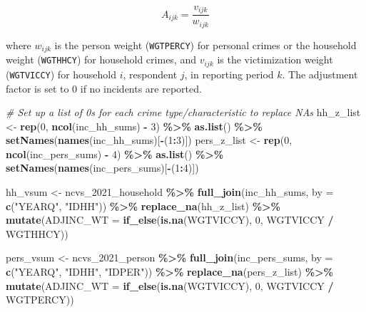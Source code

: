 \documentclass[
]{krantz}
\makeatletter
\newenvironment{Shaded}{\begin{snugshade}}{\end{snugshade}}
\newcommand{\AttributeTok}[1]{\textcolor[rgb]{0.27,0.27,0.27}{#1}}
\newcommand{\CommentTok}[1]{\textcolor[rgb]{0.37,0.37,0.37}{\textit{#1}}}
\newcommand{\DecValTok}[1]{\textcolor[rgb]{0.06,0.06,0.06}{#1}}
\newcommand{\FunctionTok}[1]{\textcolor[rgb]{0.27,0.27,0.27}{\textbf{#1}}}
\newcommand{\NormalTok}[1]{#1}
\newcommand{\OtherTok}[1]{\textcolor[rgb]{0.37,0.37,0.37}{#1}}
\newcommand{\SpecialCharTok}[1]{\textcolor[rgb]{0.43,0.43,0.43}{\textbf{#1}}}
\newcommand{\StringTok}[1]{\textcolor[rgb]{0.5,0.5,0.5}{#1}}
\newenvironment{kframe}{%
\medskip{}
\setlength{\fboxsep}{.8em}
 \def\at@end@of@kframe{}%
 \ifinner\ifhmode%
  \def\at@end@of@kframe{\end{minipage}}%
  \begin{minipage}{\columnwidth}%
 \fi\fi%
 \def\FrameCommand##1{\hskip\@totalleftmargin \hskip-\fboxsep
 \colorbox{shadecolor}{##1}\hskip-\fboxsep
     \hskip-\linewidth \hskip-\@totalleftmargin \hskip\columnwidth}%
 \MakeFramed {\advance\hsize-\width
   \@totalleftmargin\z@ \linewidth\hsize
   \@setminipage}}%
 {\par\unskip\endMakeFramed%
 \at@end@of@kframe}
\renewenvironment{Shaded}{\begin{kframe}}{\end{kframe}}
\makeatother
\begin{document}
\[ A_{ijk}=\frac{v_{ijk}}{w_{ijk}}\]

where \(w_{ijk}\) is the person weight (\texttt{WGTPERCY}) for personal crimes or the household weight (\texttt{WGTHHCY}) for household crimes, and \(v_{ijk}\) is the victimization weight (\texttt{WGTVICCY}) for household \(i\), respondent \(j\), in reporting period \(k\). The adjustment factor is set to 0 if no incidents are reported.

\begin{Shaded}
\begin{Highlighting}[]
\CommentTok{\# Set up a list of 0s for each crime type/characteristic to replace NA\textquotesingle{}s}
\NormalTok{hh\_z\_list }\OtherTok{\textless{}{-}} \FunctionTok{rep}\NormalTok{(}\DecValTok{0}\NormalTok{, }\FunctionTok{ncol}\NormalTok{(inc\_hh\_sums) }\SpecialCharTok{{-}} \DecValTok{3}\NormalTok{) }\SpecialCharTok{\%\textgreater{}\%}
  \FunctionTok{as.list}\NormalTok{() }\SpecialCharTok{\%\textgreater{}\%}
  \FunctionTok{setNames}\NormalTok{(}\FunctionTok{names}\NormalTok{(inc\_hh\_sums)[}\SpecialCharTok{{-}}\NormalTok{(}\DecValTok{1}\SpecialCharTok{:}\DecValTok{3}\NormalTok{)])}
\NormalTok{pers\_z\_list }\OtherTok{\textless{}{-}} \FunctionTok{rep}\NormalTok{(}\DecValTok{0}\NormalTok{, }\FunctionTok{ncol}\NormalTok{(inc\_pers\_sums) }\SpecialCharTok{{-}} \DecValTok{4}\NormalTok{) }\SpecialCharTok{\%\textgreater{}\%}
  \FunctionTok{as.list}\NormalTok{() }\SpecialCharTok{\%\textgreater{}\%}
  \FunctionTok{setNames}\NormalTok{(}\FunctionTok{names}\NormalTok{(inc\_pers\_sums)[}\SpecialCharTok{{-}}\NormalTok{(}\DecValTok{1}\SpecialCharTok{:}\DecValTok{4}\NormalTok{)])}

\NormalTok{hh\_vsum }\OtherTok{\textless{}{-}}\NormalTok{ ncvs\_2021\_household }\SpecialCharTok{\%\textgreater{}\%}
  \FunctionTok{full\_join}\NormalTok{(inc\_hh\_sums, }\AttributeTok{by =} \FunctionTok{c}\NormalTok{(}\StringTok{"YEARQ"}\NormalTok{, }\StringTok{"IDHH"}\NormalTok{)) }\SpecialCharTok{\%\textgreater{}\%}
  \FunctionTok{replace\_na}\NormalTok{(hh\_z\_list) }\SpecialCharTok{\%\textgreater{}\%}
  \FunctionTok{mutate}\NormalTok{(}\AttributeTok{ADJINC\_WT =} \FunctionTok{if\_else}\NormalTok{(}\FunctionTok{is.na}\NormalTok{(WGTVICCY), }\DecValTok{0}\NormalTok{, WGTVICCY }\SpecialCharTok{/}\NormalTok{ WGTHHCY))}

\NormalTok{pers\_vsum }\OtherTok{\textless{}{-}}\NormalTok{ ncvs\_2021\_person }\SpecialCharTok{\%\textgreater{}\%}
  \FunctionTok{full\_join}\NormalTok{(inc\_pers\_sums, }\AttributeTok{by =} \FunctionTok{c}\NormalTok{(}\StringTok{"YEARQ"}\NormalTok{, }\StringTok{"IDHH"}\NormalTok{, }\StringTok{"IDPER"}\NormalTok{)) }\SpecialCharTok{\%\textgreater{}\%}
  \FunctionTok{replace\_na}\NormalTok{(pers\_z\_list) }\SpecialCharTok{\%\textgreater{}\%}
  \FunctionTok{mutate}\NormalTok{(}\AttributeTok{ADJINC\_WT =} \FunctionTok{if\_else}\NormalTok{(}\FunctionTok{is.na}\NormalTok{(WGTVICCY), }\DecValTok{0}\NormalTok{, WGTVICCY }\SpecialCharTok{/}\NormalTok{ WGTPERCY))}
\end{Highlighting}
\end{Shaded}
\end{document}
